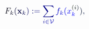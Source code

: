 \documentclass[12pt]{article}
\begin{document}
\makeatletter
\renewcommand*{\@textcolor}[3]{%
  \protect\leavevmode
  \begingroup
    \color#1{#2}#3%
  \endgroup
}
\makeatother
\begin{displaymath}
\mathcolor[RGB]{0,0,15}{F} _ { \mathcolor[RGB]{0,0,30}{k} } \mathcolor[RGB]{0,0,45}{(} { \mathbf { \mathcolor[RGB]{0,0,60}{x} } } _ { \mathcolor[RGB]{0,0,75}{k} } \mathcolor[RGB]{0,0,90}{)} \mathcolor[RGB]{0,0,105}{:} \mathcolor[RGB]{0,0,120}{=} \mathcolor[RGB]{0,0,135}{\sum} _ { \mathcolor[RGB]{0,0,150}{i} \mathcolor[RGB]{0,0,165}{\in} \mathcal { \mathcolor[RGB]{0,0,180}{V} } } \mathcolor[RGB]{0,0,195}{f} _ { \mathcolor[RGB]{0,0,210}{k} } \mathcolor[RGB]{0,0,225}{(} \mathcolor[RGB]{0,0,240}{x} _ { \mathcolor[RGB]{0,0,255}{k} } ^ { \mathcolor[RGB]{0,15,0}{(} \mathcolor[RGB]{0,15,15}{i} \mathcolor[RGB]{0,15,30}{)} } \mathcolor[RGB]{0,15,45}{)} \mathcolor[RGB]{0,15,60}{,}
\end{displaymath}
\end{document}

